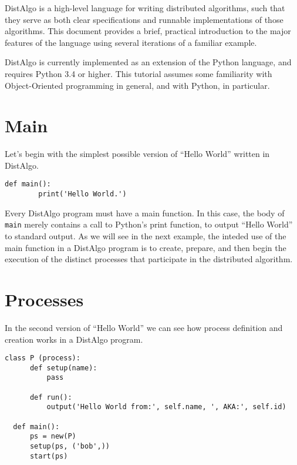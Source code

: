 \documentclass[11pt]{article}
\begin{document}
DistAlgo is a high-level language for writing distributed algorithms, such that
they serve as both clear specifications and runnable implementations of those
algorithms. This document provides a brief, practical introduction to the major
features of the language using several iterations of a familiar example.

DistAlgo is currently implemented as an extension of the Python language, and
requires Python 3.4 or higher. This tutorial assumes some familiarity with
Object-Oriented programming in general, and with Python, in particular.

\section{Main}

Let's begin with the simplest possible version of ``Hello World'' written in
DistAlgo.


\begin{lstlisting}[caption={hello\_world01.da - Main Function Definition}, label={lst:hw01}]
    def main():
        print('Hello World.')
\end{lstlisting}

\noindent Every DistAlgo program must have a main function. In this case, the body of
\texttt{main} merely contains a call to Python's print function, to output
``Hello World'' to standard output. As we will see in the next example, the
inteded use of the main function in a DistAlgo program is to create, prepare,
and then begin the execution of the distinct processes that participate in the
distributed algorithm.

\section{Processes}

In the second version of ``Hello World'' we can see how process definition and
creation works in a DistAlgo program.

\begin{lstlisting}[caption={hello\_world02.da - Process Definition}, label={lst:hw02}]
  class P (process):
      def setup(name):
          pass

      def run():
          output('Hello World from:', self.name, ', AKA:', self.id)

  def main():
      ps = new(P)
      setup(ps, ('bob',))
      start(ps)
\end{lstlisting}
\end{document}
